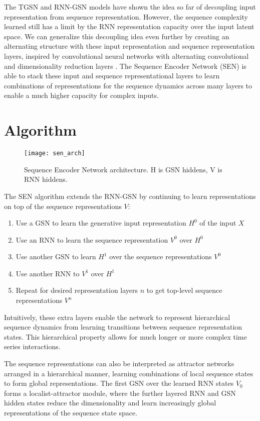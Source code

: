 The TGSN and RNN-GSN models have shown the idea so far of decoupling input representation from sequence representation. However, the sequence complexity learned still has a limit by the RNN representation capacity over the input latent space. We can generalize this decoupling idea even further by creating an alternating structure with these input representation and sequence representation layers, inspired by convolutional neural networks with alternating convolutional and dimensionality reduction layers \cite{lenet5}. The Sequence Encoder Network (SEN) is able to stack these input and sequence representational layers to learn combinations of representations for the sequence dynamics across many layers to enable a much higher capacity for complex inputs.

\section{Algorithm}

\begin{figure}[h!]
  \centering
    \texttt{[image: sen\_arch]}
\caption{Sequence Encoder Network architecture. H is GSN hiddens, V is RNN hiddens.}
\end{figure}

The SEN algorithm extends the RNN-GSN by continuing to learn representations on top of the sequence representations \(V\): 
\begin{enumerate}
\item Use a GSN to learn the generative input representation \(H^0\) of the input \(X\)
\item Use an RNN to learn the sequence representation \(V^0\) over \(H^0\)
\item Use another GSN to learn \(H^1\) over the sequence representations \(V^0\)
\item Use another RNN to \(V^1\) over \(H^1\)
\item Repeat for desired representation layers \(n\) to get top-level sequence representations \(V^n\)
\end{enumerate}

Intuitively, these extra layers enable the network to represent hierarchical sequence dynamics from learning transitions between sequence representation states. This hierarchical property allows for much longer or more complex time series interactions.

The sequence representations can also be interpreted as attractor networks\cite{mathis-mozer} arranged in a hierarchical manner, learning combinations of local sequence states to form global representations. The first GSN over the learned RNN states \(V_0\) forms a localist-attractor module, where the further layered RNN and GSN hidden states reduce the dimensionality and learn increasingly global representations of the sequence state space.

